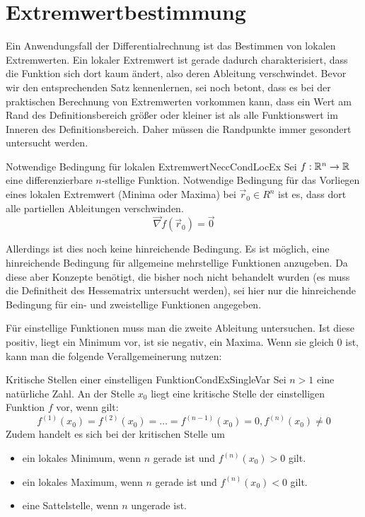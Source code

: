 \section{Extremwertbestimmung}

Ein Anwendungsfall der Differentialrechnung ist das Bestimmen von lokalen Extremwerten. Ein lokaler Extremwert ist gerade dadurch charakterisiert, dass die Funktion sich dort kaum ändert, also deren Ableitung verschwindet. Bevor wir den entsprechenden Satz kennenlernen, sei noch betont, dass es bei der praktischen Berechnung von Extremwerten vorkommen kann, dass ein Wert am Rand des Definitionsbereich größer oder kleiner ist als alle Funktionswert im Inneren des Definitionsbereich. Daher müssen die Randpunkte immer gesondert untersucht werden.

\begin{statement}{Notwendige Bedingung für lokalen Extremwert}{NeccCondLocEx}
    Sei $f: \mathbb{R}^n \to \mathbb{R}$ eine differenzierbare $n$-stellige Funktion. Notwendige Bedingung für das Vorliegen eines lokalen Extremwert (Minima oder Maxima) bei $\vec r_0 \in R^n$ ist es, dass dort alle partiellen Ableitungen verschwinden.
    $$
        \vec\nabla f(\vec r_0) = \vec 0
    $$
\end{statement}

Allerdings ist dies noch keine hinreichende Bedingung. Es ist möglich, eine hinreichende Bedingung für allgemeine mehrstellige Funktionen anzugeben. Da diese aber Konzepte benötigt, die bisher noch nicht behandelt wurden (es muss die Definitheit des Hessematrix untersucht werden), sei hier nur die hinreichende Bedingung für ein- und zweistellige Funktionen angegeben.

Für einstellige Funktionen muss man die zweite Ableitung untersuchen. Ist diese positiv, liegt ein Minimum vor, ist sie negativ, ein Maxima. Wenn sie gleich $0$ ist, kann man die folgende Verallgemeinerung nutzen:

\begin{statement}{Kritische Stellen einer einstelligen Funktion}{CondExSingleVar}
    Sei $n>1$ eine natürliche Zahl. An der Stelle $x_0$ liegt eine kritische Stelle der einstelligen Funktion $f$ vor, wenn gilt:
    $$
        f^{(1)}(x_0) = f^{(2)}(x_0) = \dots = f^{(n-1)}(x_0) = 0, f^{(n)}(x_0) \ne 0
    $$
    Zudem handelt es sich bei der kritischen Stelle um
    \begin{itemize}
        \item ein lokales Minimum, wenn $n$ gerade ist und $f^{(n)}(x_0) > 0$ gilt.
        \item ein lokales Maximum, wenn $n$ gerade ist und $f^{(n)}(x_0) < 0$ gilt.
        \item eine Sattelstelle, wenn $n$ ungerade ist.
    \end{itemize}
\end{statement}

